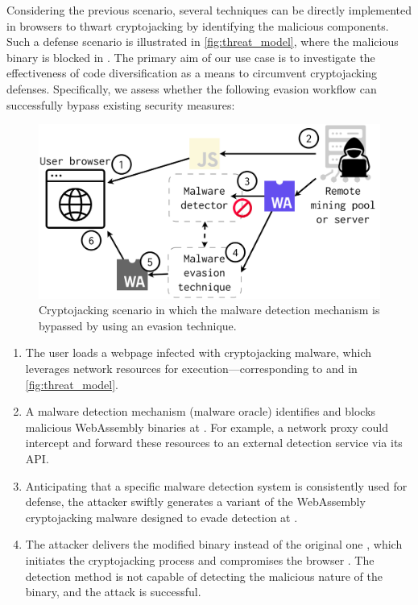 \label{threat_model}


Considering the previous scenario, several techniques can be directly implemented in browsers to thwart cryptojacking by identifying the malicious \Wasm components. 
Such a defense scenario is illustrated in \autoref{fig:threat_model}, where the \Wasm malicious binary is blocked in .
The primary aim of our use case is to investigate the effectiveness of code diversification as a means to circumvent cryptojacking defenses. 
Specifically, we assess whether the following evasion workflow can successfully bypass existing security measures:

\begin{figure}
    \centering
    \includegraphics[width=0.8\linewidth]{figures/threat_model.pdf}
    \caption{Cryptojacking scenario in which the malware detection mechanism is bypassed by using an evasion technique.}
    \label{fig:threat_model}
\end{figure}


\begin{enumerate}
    
    \item The user loads a webpage infected with cryptojacking malware, which leverages network resources for execution—corresponding to  and  in \autoref{fig:threat_model}. 
    
    \item A malware detection mechanism (malware oracle) identifies and blocks malicious WebAssembly binaries at . 
    For example, a network proxy could intercept and forward these resources to an external detection service via its API.
    
    \item Anticipating that a specific malware detection system is consistently used for defense, the attacker swiftly generates a variant of the WebAssembly cryptojacking malware designed to evade detection at .
    
    \item The attacker delivers the modified binary instead of the original one , which initiates the cryptojacking process and compromises the browser . The detection method is not capable of detecting the malicious nature of the binary, and the attack is successful.
    
\end{enumerate}


